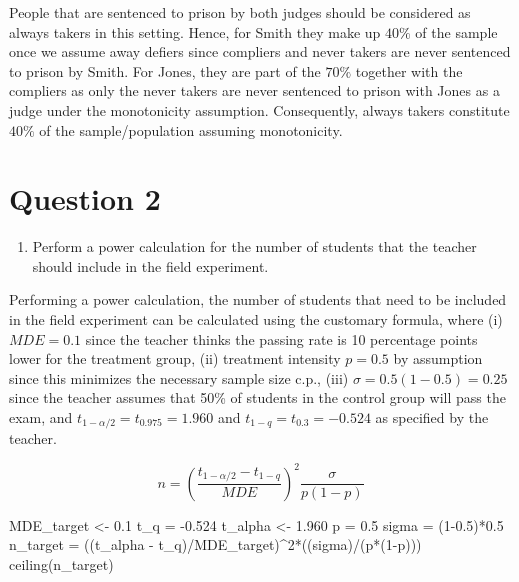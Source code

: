 \documentclass[
]{article}
\newenvironment{Shaded}{\begin{snugshade}}{\end{snugshade}}
\newcommand{\DecValTok}[1]{\textcolor[rgb]{0.00,0.00,0.81}{#1}}
\newcommand{\FloatTok}[1]{\textcolor[rgb]{0.00,0.00,0.81}{#1}}
\newcommand{\FunctionTok}[1]{\textcolor[rgb]{0.00,0.00,0.00}{#1}}
\newcommand{\NormalTok}[1]{#1}
\newcommand{\OtherTok}[1]{\textcolor[rgb]{0.56,0.35,0.01}{#1}}
\newcommand{\SpecialCharTok}[1]{\textcolor[rgb]{0.00,0.00,0.00}{#1}}
\providecommand{\tightlist}{%
  \setlength{\itemsep}{0pt}\setlength{\parskip}{0pt}}
\begin{document}
People that are sentenced to prison by both judges should be considered
as always takers in this setting. Hence, for Smith they make up \(40\%\)
of the sample once we assume away defiers since compliers and never
takers are never sentenced to prison by Smith. For Jones, they are part
of the \(70\%\) together with the compliers as only the never takers are
never sentenced to prison with Jones as a judge under the monotonicity
assumption. Consequently, always takers constitute \(40\%\) of the
sample/population assuming monotonicity.

\hypertarget{question-2}{%
\section{Question 2}\label{question-2}}

\begin{enumerate}
\def\labelenumi{\alph{enumi})}
\tightlist
\item
  Perform a power calculation for the number of students that the
  teacher should include in the field experiment.
\end{enumerate}

Performing a power calculation, the number of students that need to be
included in the field experiment can be calculated using the customary
formula, where (i) \(MDE=0.1\) since the teacher thinks the passing rate
is 10 percentage points lower for the treatment group, (ii) treatment
intensity \(p=0.5\) by assumption since this minimizes the necessary
sample size c.p., (iii) \(\sigma=0.5(1-0.5)=0.25\) since the teacher
assumes that 50\% of students in the control group will pass the exam,
and \(t_{1-\alpha/2}=t_{0.975}=1.960\) and \(t_{1-q}=t_{0.3}=-0.524\) as
specified by the teacher.

\[
n=\left(\frac{t_{1-\alpha/2}-t_{1-q}}{MDE}\right)^2\frac{\sigma}{p(1-p)}
\]

\begin{Shaded}
\begin{Highlighting}[]
\NormalTok{MDE\_target }\OtherTok{\textless{}{-}} \FloatTok{0.1}
\NormalTok{t\_q }\OtherTok{=} \SpecialCharTok{{-}}\FloatTok{0.524}
\NormalTok{t\_alpha }\OtherTok{\textless{}{-}} \FloatTok{1.960}
\NormalTok{p }\OtherTok{=} \FloatTok{0.5}
\NormalTok{sigma }\OtherTok{=}\NormalTok{ (}\DecValTok{1}\FloatTok{{-}0.5}\NormalTok{)}\SpecialCharTok{*}\FloatTok{0.5}
\NormalTok{n\_target }\OtherTok{=}\NormalTok{ ((t\_alpha }\SpecialCharTok{{-}}\NormalTok{ t\_q)}\SpecialCharTok{/}\NormalTok{MDE\_target)}\SpecialCharTok{\^{}}\DecValTok{2}\SpecialCharTok{*}\NormalTok{((sigma)}\SpecialCharTok{/}\NormalTok{(p}\SpecialCharTok{*}\NormalTok{(}\DecValTok{1}\SpecialCharTok{{-}}\NormalTok{p)))}
\FunctionTok{ceiling}\NormalTok{(n\_target)}
\end{Highlighting}
\end{Shaded}
\end{document}
